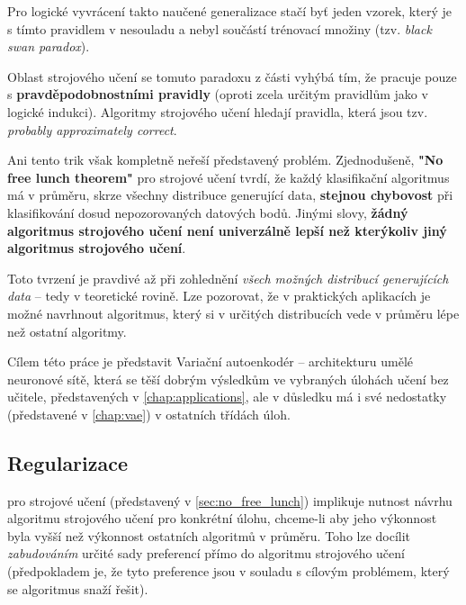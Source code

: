Pro logické vyvrácení takto naučené generalizace stačí byť jeden vzorek, který je s tímto pravidlem v nesouladu a nebyl součástí trénovací množiny (tzv. \emph{black swan paradox}).

Oblast strojového učení se tomuto paradoxu z části vyhýbá tím, že pracuje pouze s \textbf{pravděpodobnostními pravidly} (oproti zcela určitým pravidlům jako v logické indukci).
Algoritmy strojového učení hledají pravidla, která jsou tzv. \emph{probably approximately correct}. \cite{Valiant1984}

Ani tento trik však kompletně neřeší představený problém. Zjednodušeně, \textbf{"No free lunch theorem"} pro strojové učení tvrdí, že každý klasifikační algoritmus má v průměru, skrze všechny distribuce generující data, \textbf{stejnou chybovost} při klasifikování dosud nepozorovaných datových bodů. \cite{Wolpert1996}
Jinými slovy, \textbf{žádný algoritmus strojového učení není univerzálně lepší než kterýkoliv jiný algoritmus strojového učení}.

Toto tvrzení je pravdivé až při zohlednění \emph{všech možných distribucí generujících data} – tedy v teoretické rovině.
Lze pozorovat, že v praktických aplikacích je možné navrhnout algoritmus, který si v určitých distribucích vede v průměru lépe než ostatní algoritmy. \cite{Goodfellow2016}

Cílem této práce je představit Variační autoenkodér – architekturu umělé neuronové sítě, která se těší dobrým výsledkům ve vybraných úlohách učení bez učitele, představených v \autoref{chap:applications}, ale v důsledku má i své nedostatky (představené v \autoref{chap:vae}) v ostatních třídách úloh.

\subsection{Regularizace}
\label{sec:regularization}
 pro strojové učení (představený v \autoref{sec:no_free_lunch}) implikuje nutnost návrhu algoritmu strojového učení pro konkrétní úlohu, chceme-li aby jeho výkonnost byla vyšší než výkonnost ostatních algoritmů v průměru.
Toho lze docílit \emph{zabudováním} určité sady preferencí přímo do algoritmu strojového učení (předpokladem je, že tyto preference jsou v souladu s cílovým problémem, který se algoritmus snaží řešit). \cite{Goodfellow2016}

